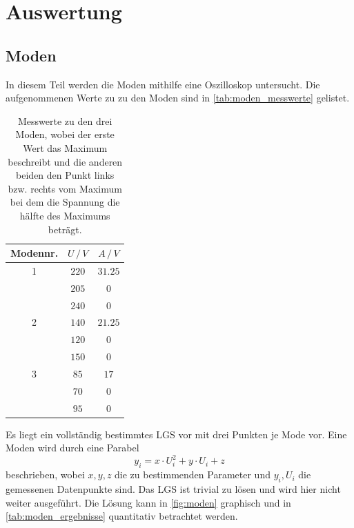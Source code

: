 \section{Auswertung}
\label{sec:Auswertung}

\subsection{Moden}
In diesem Teil werden die Moden mithilfe eine Oszilloskop untersucht.
Die aufgenommenen Werte zu zu den Moden sind in \autoref{tab:moden_messwerte} gelistet.
\begin{table}
    \centering
    \caption{Messwerte zu den drei Moden, wobei der erste Wert das Maximum beschreibt und die anderen beiden den Punkt links bzw. rechts vom Maximum bei dem die Spannung die hälfte des Maximums beträgt.}
    \begin{tabular}{c c c}
        \toprule
        Modennr. & $U \,/\, V$ & $A \,/\, V$ \\
        \midrule
        1 & $220$ & $31.25$ \\
        & $205$ & $0$ \\
        & $240$ & $0$ \\
        \hline
        2 & $140$ & $21.25$ \\
        & $120$ & $0$ \\
        & $150$ & $0$ \\
        \hline
        3 & $85$ & $17$ \\
        & $70$ & $0$ \\
        & $95$ & $0$ \\
        \bottomrule
    \end{tabular}
    \label{tab:moden_messwerte}
\end{table}
\FloatBarrier
Es liegt ein vollständig bestimmtes LGS vor mit drei Punkten je Mode vor.
Eine Moden wird durch eine Parabel
\begin{equation*}
    y_i = x \cdot U_i^2 + y \cdot U_i + z
\end{equation*}
beschrieben, wobei $x, y, z$ die zu bestimmenden Parameter und $y_i, U_i$ die gemessenen Datenpunkte sind.
Das LGS ist trivial zu lösen und wird hier nicht weiter ausgeführt.
Die Lösung kann in \autoref{fig:moden} graphisch und in \autoref{tab:moden_ergebnisse} quantitativ betrachtet werden.
